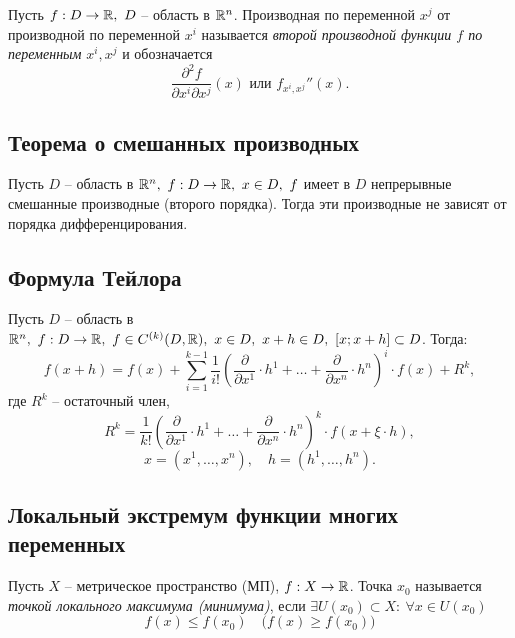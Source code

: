 \begin{definition}
    Пусть $ f:D \rightarrow\mathbb{R}, \ D $ -- область в $ \mathbb{R}^n $. Производная по переменной $ x^j $ от производной по переменной $ x^i $ называется \emph{второй производной функции $ f $ по переменным} $ x^i,x^j $ и обозначается
    \[
        \frac{\partial^2f}{\partial x^i\partial x^j}(x)\text{ или }f_{x^i,x^j}''(x).
    \]
\end{definition}

\subsection{Теорема о смешанных производных}

\begin{theorem}
    Пусть $ D $ -- область в $ \mathbb{R}^n, \ f: D \rightarrow\mathbb{R}, \ x \in D, \ f $ имеет в $ D $ непрерывные смешанные производные (второго порядка). Тогда эти производные не зависят от порядка дифференцирования.
\end{theorem}

\subsection{Формула Тейлора}

\begin{theorem}
    Пусть $D$ -- область в $\mathbb{R}^n, \ f:D\rightarrow\mathbb{R}, \ f\in C^{(k)}(D,\mathbb{R}), \ x \in D, \ x + h \in D, \ [x;x+h] \subset D$. Тогда:
    \[
        f(x + h) = f(x) + \sum_{i=1}^{k-1}\frac{1}{i!}\left(\frac{\partial}{\partial x^1}\cdot h^1 + \ldots + \frac{\partial}{\partial x^n}\cdot h^n\right)^i \cdot f(x) + R^k,
    \]
    где $R^k$ -- остаточный член,
    \[
        R^k = \frac{1}{k!}\left(\frac{\partial}{\partial x^1}\cdot h^1 + \ldots + \frac{\partial}{\partial x^n}\cdot h^n\right)^k \cdot f(x + \xi \cdot h),
    \]
    \[
        x = (x^1,\ldots,x^n), \quad h = (h^1,\ldots,h^n).
    \]
\end{theorem}

\subsection{Локальный экстремум функции многих переменных}

\begin{definition}
    Пусть $ X $ -- метрическое пространство (МП), $ f:X \rightarrow\mathbb{R} $. Точка $ x_0 $ называется \emph{точкой локального максимума (минимума)}, если $ \exists U(x_0) \subset X: \ \forall x \in U(x_0) $
    \[
        f(x)\leqslant f(x_0) \quad \big(f(x) \geqslant f(x_0)\big)
    \]
\end{definition}

